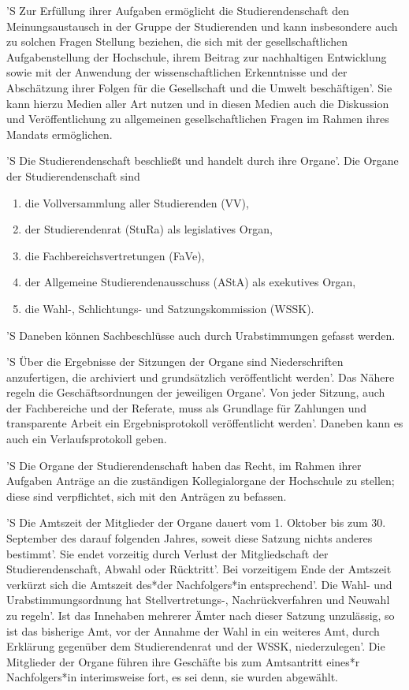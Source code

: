 \documentclass[fontsize=12pt,parskip=half]{scrartcl}
\begin{document}
\begin{contract}
  'S Zur Erfüllung ihrer Aufgaben ermöglicht die Studierendenschaft den
  Meinungsaustausch in der Gruppe der Studierenden und kann insbesondere auch zu
  solchen Fragen Stellung beziehen, die sich mit der gesellschaftlichen
  Aufgabenstellung der Hochschule, ihrem Beitrag zur nachhaltigen Entwicklung
  sowie mit der Anwendung der wissenschaftlichen Erkenntnisse und der
  Abschätzung ihrer Folgen für die Gesellschaft und die Umwelt beschäftigen'. Sie
  kann hierzu Medien aller Art nutzen und in diesen Medien auch die Diskussion
  und Veröffentlichung zu allgemeinen gesellschaftlichen Fragen im Rahmen ihres
  Mandats ermöglichen. 



  'S Die Studierendenschaft beschließt und handelt durch ihre Organe'. Die Organe
  der Studierendenschaft sind
  \begin{enumerate}[\qquad 1.]
    \item die Vollversammlung aller Studierenden (VV),
    \item der Studierendenrat (StuRa) als legislatives Organ,
    \item die Fachbereichsvertretungen (FaVe),
    \item der Allgemeine Studierendenausschuss (AStA) als exekutives Organ,
    \item die Wahl-, Schlichtungs- und Satzungskommission (WSSK).
  \end{enumerate}
  'S Daneben können Sachbeschlüsse auch durch Urabstimmungen gefasst werden.

  'S Über die Ergebnisse der Sitzungen der Organe sind Niederschriften
  anzufertigen, die archiviert und grundsätzlich veröffentlicht werden'. Das
  Nähere regeln die Geschäftsordnungen der jeweiligen Organe'. Von jeder Sitzung,
  auch der Fachbereiche und der Referate, muss als Grundlage für Zahlungen und
  transparente Arbeit ein Ergebnisprotokoll veröffentlicht werden'. Daneben kann
  es auch ein Verlaufsprotokoll geben.

  'S Die Organe der Studierendenschaft haben das Recht, im Rahmen ihrer Aufgaben
  Anträge an die zuständigen Kollegialorgane der Hochschule zu stellen; diese
  sind verpflichtet, sich mit den Anträgen zu befassen.

  'S Die Amtszeit der Mitglieder der Organe dauert vom 1. Oktober bis zum 30.
  September des darauf folgenden Jahres, soweit diese Satzung nichts anderes
  bestimmt'. Sie endet vorzeitig durch Verlust der Mitgliedschaft der
  Studierendenschaft, Abwahl oder Rücktritt'. Bei vorzeitigem Ende der Amtszeit
  verkürzt sich die Amtszeit des*der Nachfolgers*in entsprechend'. Die Wahl- und
  Urabstimmungsordnung hat Stellvertretungs-, Nachrückverfahren und Neuwahl zu
  regeln'. Ist das Innehaben mehrerer Ämter nach dieser Satzung unzulässig, so
  ist das bisherige Amt, vor der Annahme der Wahl in ein weiteres Amt, durch
  Erklärung gegenüber dem Studierendenrat und der WSSK, niederzulegen'. Die
  Mitglieder der Organe führen ihre Geschäfte bis zum Amtsantritt eines*r
  Nachfolgers*in interimsweise fort, es sei denn, sie wurden abgewählt.


\end{contract}
\end{document}
